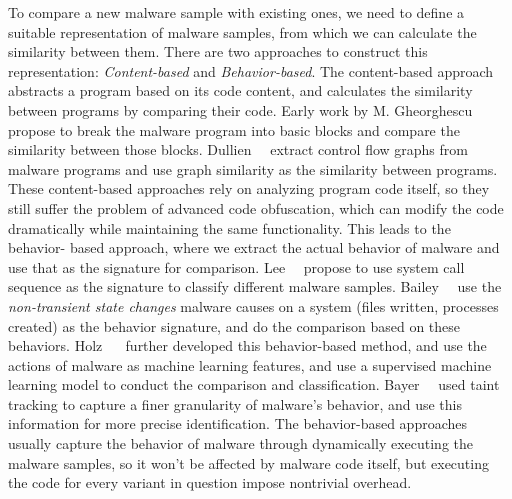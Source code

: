 To compare a new malware sample with existing ones, we need to define a 
suitable representation of malware samples, from which we can calculate 
the similarity between them. There are two approaches to construct this 
representation: \textit{Content-based} and \textit{Behavior-based}. 
The content-based approach abstracts a program based on its code content, and 
calculates the similarity between programs by comparing their code. 
Early work by M. Gheorghescu~\etal~\cite{Gheorghescu2006ANAV} propose 
to break the malware program into basic blocks and compare the similarity 
between those blocks.
Dullien~\etal~\cite{dullien2005graph} extract control flow graphs from 
malware programs and use graph similarity as the similarity between programs.
These content-based approaches rely on analyzing program code itself, so 
they still suffer the problem of advanced code obfuscation, which can modify
the code dramatically while maintaining the same functionality. This leads to
the behavior-
based approach, where we extract the actual behavior of malware and use that
as the signature for comparison. Lee~\etal~\cite{lee2006behavioral} propose
to use system call sequence as the signature to classify different malware
samples. Bailey~\etal~\cite{bailey2007automated} use the \textit{non-transient
state changes} malware causes on a system (files written, processes created) as 
the behavior signature, and do the comparison based on these behaviors. Holz 
~\etal~\cite{rieck2008learning} further developed this behavior-based method, 
and use the actions of malware as machine learning features, and use a 
supervised machine learning model to conduct the comparison and classification.
Bayer~\etal~\cite{bayer2009scalable} used taint tracking to capture a finer
granularity of malware's behavior, and use this information for more precise
identification. The behavior-based approaches usually capture the behavior of
malware through dynamically executing the malware samples, so it won't be 
affected by malware code itself, but executing the code for every variant in
question impose nontrivial overhead. 

